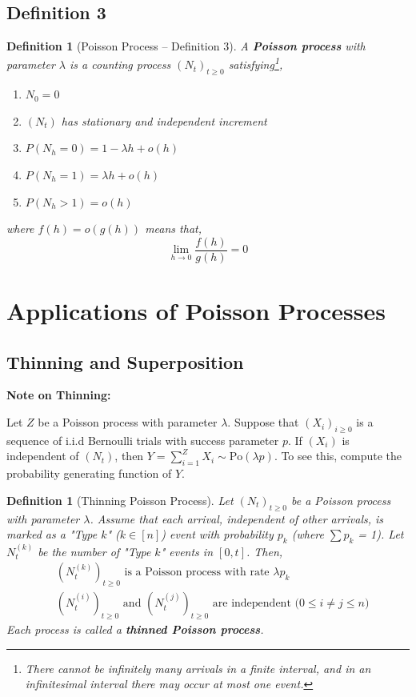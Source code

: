 \documentclass{tufte-handout}
\newtheorem{defn}[thm]{Definition}
\begin{document}
\subsection{Definition 3}
\begin{defn}[Poisson Process -- Definition 3]
  A \textbf{Poisson process} with parameter $\lambda$ is a counting process $(N_t)_{t \geq 0}$ satisfying\footnote{There cannot be infinitely many arrivals in a finite interval, and in an infinitesimal interval there may occur at most one event.},
  \begin{enumerate}
    \item $N_0 = 0$
    \item $(N_t)$ has stationary and independent increment
    \item $P(N_h = 0) = 1 - \lambda h + o(h)$
    \item $P(N_h = 1) = \lambda h + o(h)$
    \item $P(N_h > 1) = o(h)$ 
  \end{enumerate}
  \noindent where $f(h) = o(g(h))$ means that,
  \[\lim _{h \rightarrow 0} \frac{f(h)}{g(h)}=0\]
\end{defn}

\section{Applications of Poisson Processes}
\subsection{Thinning and Superposition}
\begin{marginfigure}
  \textbf{Note on Thinning:}

  \noindent Let $Z$ be a Poisson process with parameter $\lambda$. Suppose that $(X_i)_{i \geq 0}$ is a sequence of i.i.d Bernoulli trials with success parameter $p$. If $(X_i)$ is independent of $(N_t)$, then $Y = \sum_{i = 1}^Z X_i \sim \text{Po}(\lambda p)$. To see this, compute the probability generating function of $Y$.
\end{marginfigure}

\begin{defn}[Thinning Poisson Process]
  Let $(N_t)_{t \geq 0}$ be a Poisson process with parameter $\lambda$. Assume that each arrival, independent of other arrivals, is marked as a "Type $k$" ($k \in [n]$) event with probability $p_k$ (where $\sum p_k$ = 1). Let $N_t^{(k)}$ be the number of "Type $k$" events in $[0,t]$. Then,
  \begin{align*}
    &\left(N_t^{(k)}\right)_{t \geq 0} \text{ is a Poisson process with rate $\lambda p_k$} \\
    &\left(N_{t}^{(i)}\right)_{t \geq 0} \text{ and } \left(N_{t}^{(j)}\right)_{t \geq 0} \text{ are independent ($0 \leq i \neq j \leq n$)}
  \end{align*}
  Each process is called a \textbf{thinned Poisson process}.
\end{defn}
\end{document}
